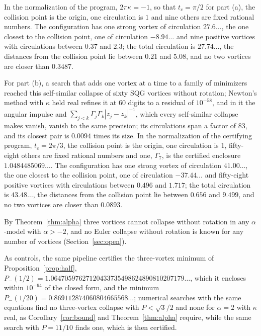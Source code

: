 \documentclass[11pt]{article}
\theoremstyle{definition}
\begin{document}
In the normalization of the program, $2\pi\kappa = -1$, so that $t_c = \pi/2$ for part (a), the collision point is the origin, one circulation is $1$ and nine others are fixed rational numbers. The configuration has one strong vortex of circulation $27.6\ldots$, the one closest to the collision point, one of circulation $-8.94\ldots$ and nine positive vortices with circulations between $0.37$ and $2.3$; the total circulation is $27.74\ldots$, the distances from the collision point lie between $0.21$ and $5.08$, and no two vortices are closer than $0.3487$.

For part (b), a search that adds one vortex at a time to a family of minimizers reached this self-similar collapse of sixty SQG vortices without rotation; Newton's method with $\kappa$ held real refines it at 60 digits to a residual of $10^{-58}$, and in it the angular impulse and $\sum_{j<k}\Gamma_j\Gamma_k|z_j - z_k|^{-1}$, which every self-similar collapse makes vanish, vanish to the same precision; its circulations span a factor of $83$, and its closest pair is $0.0094$ times its size. In the normalization of the certifying program, $t_c = 2\pi/3$, the collision point is the origin, one circulation is $1$, fifty-eight others are fixed rational numbers and one, $\Gamma_7$, is the certified enclosure $1.0484485069\ldots$. The configuration has one strong vortex of circulation $41.00\ldots$, the one closest to the collision point, one of circulation $-37.44\ldots$ and fifty-eight positive vortices with circulations between $0.496$ and $1.717$; the total circulation is $43.48\ldots$, the distances from the collision point lie between $0.656$ and $9.499$, and no two vortices are closer than $0.0893$.

By Theorem~\ref{thm:alpha} three vortices cannot collapse without rotation in any $\alpha$-model with $\alpha > -2$, and no Euler collapse without rotation is known for any number of vortices (Section~\ref{sec:open}).

As controls, the same pipeline certifies the three-vortex minimum of Proposition~\ref{prop:half}, $P_-(1/2) = 1.06470597627120433735498624890810207179\ldots$, which it encloses within $10^{-94}$ of the closed form, and the minimum $P_-(1/20) = 0.869112874060804665568\ldots$; numerical searches with the same equations find no three-vortex collapse with $P < \sqrt{3}/2$ and none for $\alpha = 2$ with $\kappa$ real, as Corollary~\ref{cor:bound} and Theorem~\ref{thm:alpha} require, while the same search with $P = 11/10$ finds one, which is then certified.
\end{document}
